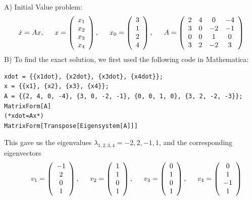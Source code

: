 \documentclass[11pt,answers]{exam}
\begin{document}
\begin{questions}
\begin{solution}
A) Initial Value problem:
\[
\dot{x} = Ax, \hbox{\hspace{1.5em}} x = \left(\begin{array}{c}x_1 \\ x_2 \\ x_3 \\ x_4\end{array}\right), \hbox{\hspace{1.5em}} x_0 = \left(\begin{array}{c}3 \\ 1 \\ 2 \\ 4\end{array}\right), \hbox{\hspace{1.5em}} A = \left(\begin{array}{cccc} 2 & 4 & 0 & -4 \\  3 & 0 & -2 & -1 \\  0 & 0 & 1 & 0\\3 & 2 & -2 & 3  \end{array}\right)
\]
B) To find the exact solution, we first used the following code in Mathematica:
\begin{verbatim}
xdot = {{x1dot}, {x2dot}, {x3dot}, {x4dot}};
x = {{x1}, {x2}, {x3}, {x4}};
A = {{2, 4, 0, -4}, {3, 0, -2, -1}, {0, 0, 1, 0}, {3, 2, -2, -3}};
MatrixForm[A]
(*xdot=Ax*)
MatrixForm[Transpose[Eigensystem[A]]]
\end{verbatim}
This gave us the eigenvalues $\lambda_{1,2,3,4} = -2,2,-1,1$, and the corresponding eigenvectors 
\[
\hbox{\hspace{1.5em}} v_1 = \left(\begin{array}{c}-1\\ 2 \\ 0 \\ 1\end{array}\right), \hbox{\hspace{1.5em}} v_2 = \left(\begin{array}{c}1 \\ 1 \\ 0 \\ 1\end{array}\right), \hbox{\hspace{1.5em}} v_3 = \left(\begin{array}{c}0 \\ 1 \\ 0 \\ 1\end{array}\right), \hbox{\hspace{1.5em}} v_4 = \left(\begin{array}{c}0 \\ 1 \\ -1 \\ 1\end{array}\right)
\]
\end{solution}
\end{questions}
\end{document}
